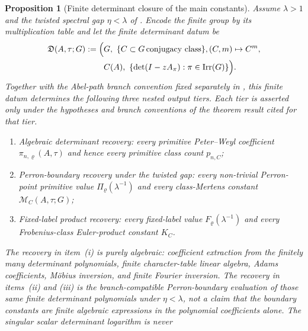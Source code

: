 \documentclass[11pt,a4paper]{amsart}
\theoremstyle{plain}
\newtheorem{proposition}[theorem]{Proposition}
\theoremstyle{definition}
\theoremstyle{remark}
\DeclareMathOperator{\Irr}{Irr}
\begin{document}
\begin{proposition}[Finite determinant closure of the main constants]
  \label{prop:finite-data-main-chain-closure}
  \label{prop:finite-data-main-factorisation-closure}
  Assume \(\lambda>1\) and the twisted spectral gap
  \(\eta<\lambda\) of .  Encode the finite
  group by its multiplication table and let the finite determinant datum be
  \begin{equation*}
    \begin{aligned}
      \mathfrak D(A,\tau;G):=
      \Bigl(&G,\ \{C\subset G\,\textup{conjugacy class}\},
      (C,m)\mapsto C^m, \\
      &C(A),\ \{\det(I-zA_\pi):\pi\in\Irr(G)\}\Bigr).
    \end{aligned}
  \end{equation*}
  Together with the Abel-path branch convention fixed separately in
  , this
  finite datum determines the following three nested output tiers.  Each tier
  is asserted only under the hypotheses and branch conventions of the theorem
  result cited for that tier.
  \begin{enumerate}[label=\textup{(\roman*)},leftmargin=*]
    \item \emph{Algebraic determinant recovery:} every primitive Peter--Weyl coefficient
    \(\pi_{n,\varrho}(A,\tau)\) and hence every primitive class count
    \(p_{n,C}\);
    \item \emph{Perron-boundary recovery under the twisted gap:} every non-trivial Perron-point primitive value
    \(\Pi_\varrho(\lambda^{-1})\) and every class-Mertens constant
    \(\mathcal M_C(A,\tau;G)\);
    \item \emph{Fixed-label product recovery:} every fixed-label value \(F_\varrho(\lambda^{-1})\) and every
    Frobenius-class Euler-product constant \(K_C\).
  \end{enumerate}
  The recovery in item~\textup{(i)} is purely algebraic: coefficient
  extraction from the finitely many determinant polynomials, finite
  character-table linear algebra, Adams coefficients, M\"obius inversion, and
  finite Fourier inversion.  The recovery in items~\textup{(ii)} and
  \textup{(iii)} is the branch-compatible Perron-boundary evaluation of those
  same finite determinant polynomials under \(\eta<\lambda\), not a claim that
  the boundary constants are finite algebraic expressions in the polynomial
  coefficients alone.  The singular scalar determinant logarithm is never

\end{proposition}
\end{document}
